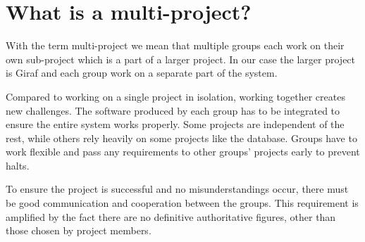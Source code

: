 \section{What is a multi-project?}
With the term multi-project we mean that multiple groups each work on their own sub-project which is a part of a larger project. In our case the larger project is Giraf and each group work on a separate part of the system.

Compared to working on a single project in isolation, working together creates new challenges. The software produced by each group has to be integrated to ensure the entire system works properly. Some projects are independent of the rest, while others rely heavily on some projects like the database. Groups have to work flexible and pass any requirements to other groups' projects early to prevent halts.

To ensure the project is successful and no misunderstandings occur, there must be good communication and cooperation between the groups. This requirement is amplified by the fact there are no definitive authoritative figures, other than those chosen by project members.
